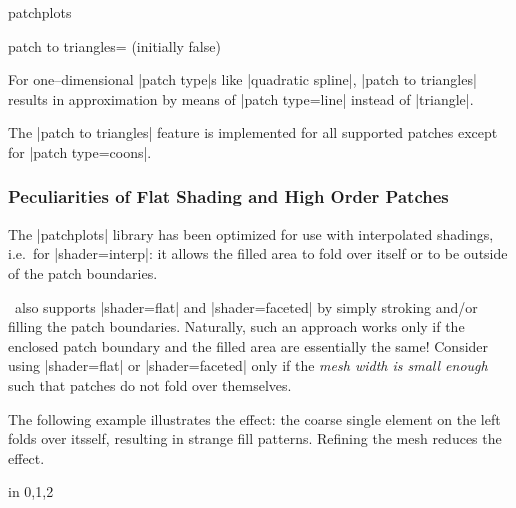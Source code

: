 \begin{pgfplotslibrary}{patchplots}
\begin{pgfplotskey}{patch to triangles= (initially false)}
\begin{codeexample}[]
{%
}
\end{codeexample}
	
	For one--dimensional |patch type|s like |quadratic spline|, |patch to triangles| results in approximation by means of |patch type=line| instead of |triangle|. 

	The |patch to triangles| feature is implemented for all supported patches except for |patch type=coons|.
\end{pgfplotskey}

\subsubsection{Peculiarities of Flat Shading and High Order Patches}
\label{sec:lib:patchplots:flat}
The |patchplots| library has been optimized for use with interpolated shadings, i.e.\ for |shader=interp|: it allows the filled area to fold over itself or to be outside of the patch boundaries.

\PGFPlots\ also supports |shader=flat| and |shader=faceted| by simply stroking and/or filling the patch boundaries. Naturally, such an approach works only if the enclosed patch boundary and the filled area are essentially the same! Consider using |shader=flat| or |shader=faceted| only if the \emph{mesh width is small enough} such that patches do not fold over themselves.

The following example illustrates the effect: the coarse single element on the left folds over itsself, resulting in strange fill patterns. Refining the mesh reduces the effect.
\begin{codeexample}[]
\foreach \level in {0,1,2} {%
}
\end{codeexample}


\end{pgfplotslibrary}
